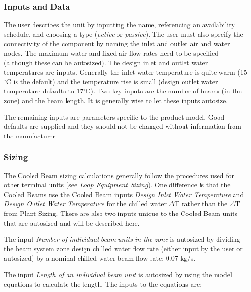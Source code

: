 \subsubsection{Inputs and Data}\label{inputs-and-data-3}

The user describes the unit by inputting the name, referencing an availability schedule, and choosing a type (\emph{active} or \emph{passive}). The user must also specify the connectivity of the component by naming the inlet and outlet air and water nodes. The maximum water and fixed air flow rates need to be specified (although these can be autosized). The design inlet and outlet water temperatures are inputs. Generally the inlet water temperature is quite warm (15\(^{\circ}\)C is the default) and the temperature rise is small (design outlet water temperature defaults to 17\(^{\circ}\)C). Two key inputs are the number of beams (in the zone) and the beam length. It is generally wise to let these inputs autosize.

The remaining inputs are parameters specific to the product model. Good defaults are supplied and they should not be changed without information from the manufacturer.

\subsubsection{Sizing}\label{sizing}

The Cooled Beam sizing calculations generally follow the procedures used for other terminal units (see \emph{Loop Equipment Sizing}). One difference is that the Cooled Beams use the Cooled Beam inputs \emph{Design Inlet Water Temperature} and \emph{Design Outlet Water Temperature} for the chilled water \(\Delta\)T rather than the \(\Delta\)T from Plant Sizing. There are also two inputs unique to the Cooled Beam units that are autosized and will be described here.

The input \emph{Number of individual beam units in the zone} is autosized by dividing the beam system zone design chilled water flow rate (either input by the user or autosized) by a nominal chilled water beam flow rate: 0.07 kg/s.

The input \emph{Length of an individual beam unit} is autosized by using the model equations to calculate the length. The inputs to the equations are:

